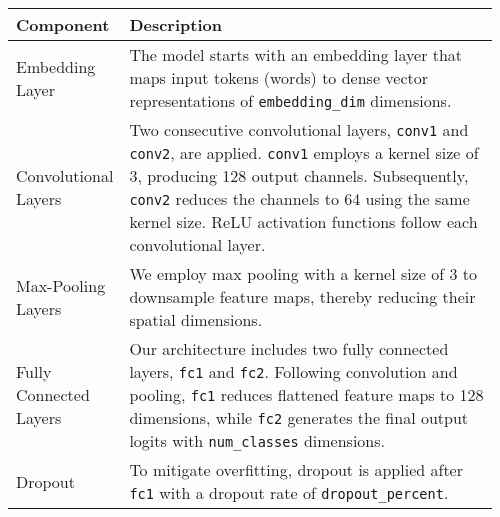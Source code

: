 \begin{table}[!ht]
    \centering
        \begin{tabular}{|p{0.13\linewidth}|p{0.83\linewidth}|}
            \hline
            Component & Description \\
            \hline
            Embedding Layer &  The model starts with an embedding layer that maps input tokens (words) to dense vector representations of \texttt{embedding\_dim} dimensions.\\
            \hline
            Convolutional Layers & Two consecutive convolutional layers, \texttt{conv1} and \texttt{conv2}, are applied. \texttt{conv1} employs a kernel size of 3, producing 128 output channels. Subsequently, \texttt{conv2} reduces the channels to 64 using the same kernel size. ReLU activation functions follow each convolutional layer. \\
            \hline
            Max-Pooling Layers &  We employ max pooling with a kernel size of 3 to downsample feature maps, thereby reducing their spatial dimensions. \\
            \hline
            Fully Connected Layers & Our architecture includes two fully connected layers, \texttt{fc1} and \texttt{fc2}. Following convolution and pooling, \texttt{fc1} reduces flattened feature maps to 128 dimensions, while \texttt{fc2} generates the final output logits with \texttt{num\_classes} dimensions. \\
            \hline
            Dropout & To mitigate overfitting, dropout is applied after \texttt{fc1} with a dropout rate of \texttt{dropout\_percent}. \\
            \hline
        \end{tabular}
\end{table}

\vspace{-1em}
